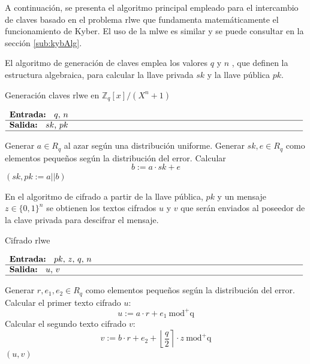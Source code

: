 A continuación, se presenta el algoritmo principal empleado para el intercambio de claves basado en el problema \acrshort{rlwe} que fundamenta matemáticamente el funcionamiento de Kyber. El uso de la \acrshort{mlwe} es similar y se puede consultar en la sección \ref{sub:kybAlg}.
\newline

El algoritmo de generación de claves emplea los valores \(q\) y \(n\) , que definen la estructura algebraica, para calcular la llave privada \(sk\)  y la llave pública \(pk\).
\begin{algorithm}[H]
	\caption{Generación claves \acrshort{rlwe} en $\mathbb{Z}_q[x]/(X^n + 1)$ \protect\footnotemark[\value{footnote}]} 
	$\begin{array}{p{\textwidth}}
		\textbf{Entrada: } \(q\), \(n\)\\ 
		\hline
		\textbf{Salida: } \(sk\), \(pk\) \\ 
		\hline
	\end{array}$
	\begin{algorithmic}[1]
		\State Generar \(a\in R_q\)  al azar según una distribución uniforme.
		\State Generar \(sk, e \in R_q\) como elementos pequeños según la distribución del error. \Statex {}
		\State Calcular 
		\begin{equation}
			b:=a\cdot sk + e
		\end{equation}
		\State \Return \((sk, pk:=a||b)\)
	\end{algorithmic}
\end{algorithm}

En el algoritmo de cifrado a partir de la llave pública, \(pk\) y un mensaje \(z\in \{0,1\}^n \) se obtienen los textos cifrados \(u\) y \(v\) que serán enviados al poseedor de la clave privada para descifrar el mensaje. 
\begin{algorithm}[H]
	\caption{Cifrado \acrshort{rlwe} \protect\footnotemark[\value{footnote}]} 
	$\begin{array}{p{\textwidth}}
		\textbf{Entrada: } \(pk\), \(z\), \(q\), \(n\)\\ 
		\hline
		\textbf{Salida: } \(u\), \(v\) \\ 
		\hline
	\end{array}$
	\begin{algorithmic}[1]
		\State Generar \(r, e_1, e_2 \in R_q\) como elementos pequeños según la distribución del error.
		\State Calcular el primer texto cifrado \(u\):
		\begin{equation}
			u:=a\cdot r + e_1 \ \text{mod}^{+}\text{q}
		\end{equation}
		\State Calcular el segundo texto cifrado \(v\):
		\begin{equation}
			v:=b\cdot r+e_2+\left\lfloor \dfrac{q}{2} \right\rceil \cdot z \ \text{mod}^{+}\text{q}
		\end{equation}
		\State \Return \((u,v)\) 
		 
	\end{algorithmic}
\end{algorithm}

